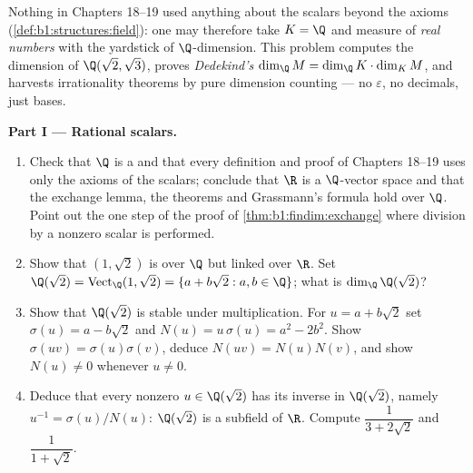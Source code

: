 \begin{problem}\label{pb:b1:findim:1}
Nothing in Chapters 18--19 used anything about the scalars beyond
the  axioms (\cref{def:b1:structures:field}): one may
therefore take $K = \Q$ and measure  of \emph{real numbers}
with the yardstick of $\Q$-dimension. This problem computes the
dimension of $\Q(\sqrt2, \sqrt3)$, proves \emph{Dedekind's } $\dim_\Q M = \dim_\Q K \cdot \dim_K M$, and harvests
irrationality theorems by pure dimension counting --- no
$\varepsilon$, no decimals, just bases.

\medskip
\noindent\textbf{Part I --- Rational scalars.}
\begin{enumerate}
  \item Check that $\Q$ is a  and that every definition and
        proof of Chapters 18--19 uses only the  axioms of the
        scalars; conclude that $\R$ is a $\Q$-vector space and
        that the exchange lemma, the  theorems and
        Grassmann's formula hold over $\Q$. Point out the one step
        of the proof of \cref{thm:b1:findim:exchange} where
        division by a nonzero scalar is performed.
  \item Show that $(1, \sqrt2)$ is  over $\Q$ but linked over
        $\R$. Set $\Q(\sqrt2) = \operatorname{Vect}_\Q(1,
        \sqrt2) = \{a + b\sqrt2 : a, b \in \Q\}$; what is
        $\dim_\Q \Q(\sqrt2)$?
  \item Show that $\Q(\sqrt2)$ is stable under multiplication.
        For $u = a + b\sqrt2$ set $\sigma(u) = a - b\sqrt2$ and
        $N(u) = u\,\sigma(u) = a^2 - 2b^2$. Show $\sigma(uv) =
        \sigma(u)\sigma(v)$, deduce $N(uv) = N(u)N(v)$, and show
        $N(u) \neq 0$ whenever $u \neq 0$.
  \item Deduce that every nonzero $u \in \Q(\sqrt2)$ has its
        inverse in $\Q(\sqrt2)$, namely $u^{-1} =
        \sigma(u)/N(u)$: $\Q(\sqrt2)$ is a subfield of $\R$.
        Compute $\dfrac1{3 + 2\sqrt2}$ and $\dfrac1{1 + \sqrt2}$.
\end{enumerate}


\end{problem}
